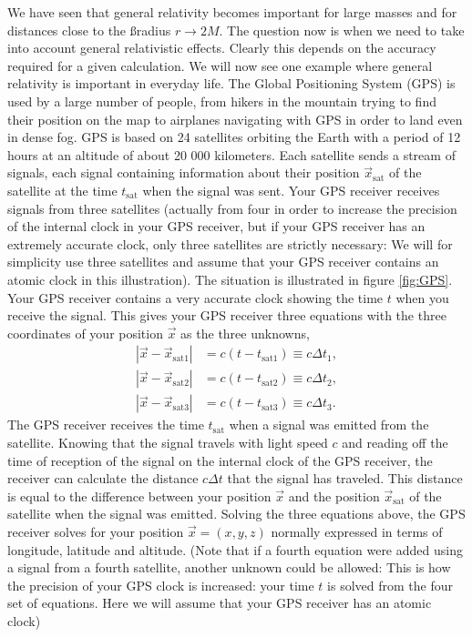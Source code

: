 {\begin{multicols}{2}
We have seen that general relativity becomes important for large masses and for distances close to the \ss radius $r\rightarrow2M$. The question now is when we need to take into account general relativistic effects. Clearly this depends on the accuracy required for a given calculation. We will now see one example where general relativity is important in everyday life. The Global Positioning System (GPS) is used by a large number of people, from hikers in the mountain trying to find their position on the map to airplanes navigating with GPS in order to land even in dense fog. GPS is based on 24 satellites orbiting the Earth with a period of 12 hours at an altitude of about 20 000 kilometers. Each satellite sends a stream of signals, each signal containing information about their position $\vec{x}_\mathrm{sat}$ of the satellite at the time $t_\mathrm{sat}$ when the signal was sent. Your GPS receiver receives signals from three satellites (actually from four in order to increase the precision of the internal clock in your GPS receiver, but if your GPS receiver has an extremely accurate clock, only three satellites are strictly necessary: We will for simplicity use three satellites and assume that your GPS receiver contains an atomic clock in this illustration). The situation is illustrated in figure \ref{fig:GPS}. Your GPS receiver contains a very accurate clock showing the time $t$ when you receive the signal. This gives your GPS receiver three equations with the three coordinates of your position $\vec{x}$ as the three unknowns,
\begin{align*}
|\vec{x}-\vec{x}_\mathrm{sat1}|&=c(t-t_\mathrm{sat1})\equiv c\Delta t_1,\\
|\vec{x}-\vec{x}_\mathrm{sat2}|&=c(t-t_\mathrm{sat2})\equiv c\Delta t_2,\\
|\vec{x}-\vec{x}_\mathrm{sat3}|&=c(t-t_\mathrm{sat3})\equiv c\Delta t_3.
\end{align*}
The GPS receiver receives the time $t_\mathrm{sat}$ when a signal was emitted from the satellite. Knowing that the signal travels with light speed $c$ and reading off the time of reception of the signal on the internal clock of the GPS receiver, the receiver can calculate the distance $c\Delta t$ that the signal has traveled. This distance is equal to the difference between your position $\vec{x}$ and the position $\vec{x}_\mathrm{sat}$ of the satellite when the signal was emitted. Solving the three equations above, the GPS receiver solves for your position $\vec{x}=(x,y,z)$ normally expressed in terms of longitude, latitude and altitude. (Note that if a fourth equation were added using a signal from a fourth satellite, another unknown could be allowed: This is how the precision of your GPS clock is increased: your time $t$ is solved from the four set of equations. Here we will assume that your GPS receiver has an atomic clock)


\end{multicols}}

